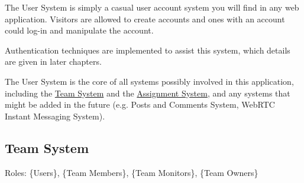 \documentclass[12pt]{report}
\begin{document}
The User System is simply a casual user account system you will find in any web application.
Visitors are allowed to create accounts and ones with an account could log-in and manipulate the account.
\vspace{1 em}

Authentication techniques are implemented to assist this system, which details are given in later chapters.
\vspace{1 em}

The User System is the core of all systems possibly involved in this application,
including the \hyperref[overview.project-objectives.team-system]{Team System}
and the \hyperref[overview.project-objectives.assignment-system]{Assignment System},
and any systems that might be added in the future (e.g. Posts and Comments System, WebRTC Instant Messaging System).

\newpage
\subsection{Team System} \label{overview.project-objectives.team-system}

Roles: \{Users\}, \{Team Members\}, \{Team Monitors\}, \{Team Owners\}
\end{document}
